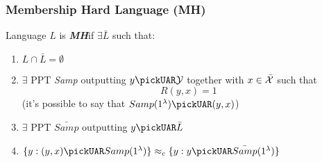 \subsubsection{Membership Hard Language (MH)}
\begin{definition}
    Language $L$ is \textit{ \textbf{MH}}if $ \exists  \bar{L}$ such that:
    \begin{enumerate}
        \item $L \cap \bar{L} = \emptyset$
        \item $ \exists$ PPT \textit{Samp} outputting $y \pickUAR \mathcal{Y}$
            together with $x \in \bar{\mathcal{X}}$ such that 
            \[
              R(y,x)=1  
            \]
            (it's possible
            to say that $Samp(1^{\lambda}) \pickUAR (y,x)$)
        \item $ \exists$ PPT $\bar{Samp}$ outputting $y \pickUAR \bar{L}$
        \item $\{y:(y,x) \pickUAR Samp(1^{\lambda})\} \approx_{c} \{y:y
            \pickUAR \bar{Samp}(1^{\lambda})\}$
    \end{enumerate}
    
\end{definition}

